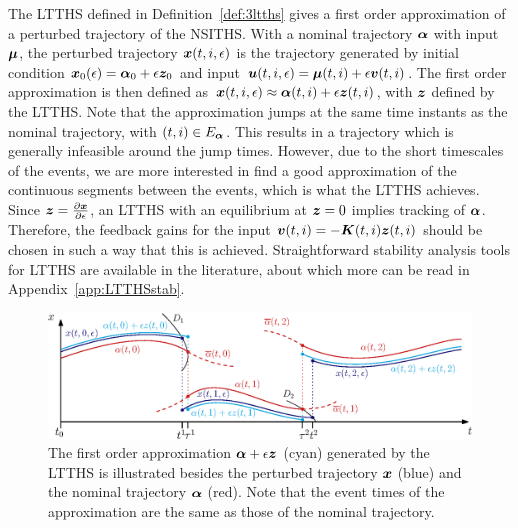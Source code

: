 \documentclass[../DC2017114Bouma.tex]{subfiles}
\begin{document}
The LTTHS defined in Definition~\ref{def:3ltths} gives a first order approximation of a perturbed trajectory of the NSITHS. With a nominal trajectory $\boldsymbol{\alpha}$ with input $\boldsymbol{\mu}$, the perturbed trajectory ${\boldsymbol{x}}(t,i,\epsilon)$ is the trajectory generated by initial condition ${\boldsymbol{x}}_0(\epsilon) = \boldsymbol{\alpha}_0 + \epsilon{\boldsymbol{z}}_0$ and input ${\boldsymbol{u}}(t,i,\epsilon) = \boldsymbol{\mu}(t,i) + \epsilon{\boldsymbol{v}}(t,i)$. The first order approximation is then defined as ${\boldsymbol{x}}(t,i,\epsilon) \approx \boldsymbol{\alpha}(t,i) + \epsilon{\boldsymbol{z}}(t,i)$, with ${\boldsymbol{z}}$ defined by the LTTHS. Note that the approximation jumps at the same time instants as the nominal trajectory, with $(t,i) \in E_{\boldsymbol{\alpha}}$. This results in a trajectory which is generally infeasible around the jump times. However, due to the short timescales of the events, we are more interested in find a good approximation of the continuous segments between the events, which is what the LTTHS achieves. Since ${\boldsymbol{z}} = \frac{\partial{\boldsymbol{x}}}{\partial\epsilon}$, an LTTHS with an equilibrium at ${\boldsymbol{z}} = 0$ implies tracking of $\boldsymbol{\alpha}$. Therefore, the feedback gains for the input ${\boldsymbol{v}}(t,i) = -{\boldsymbol{K}}(t,i){\boldsymbol{z}}(t,i)$ should be chosen in such a way that this is achieved. Straightforward stability analysis tools for LTTHS are available in the literature, about which more can be read in Appendix~\ref{app:LTTHSstab}.

\begin{figure}[h]
\centering
\includegraphics[width=.9\textwidth]{refspreadapprox.eps}\caption{The first order approximation $\boldsymbol{\alpha} + \epsilon{\boldsymbol{z}}$ (cyan) generated by the LTTHS is illustrated besides the perturbed trajectory ${\boldsymbol{x}}$ (blue) and the nominal trajectory $\boldsymbol{\alpha}$ (red). Note that the event times of the approximation are the same as those of the nominal trajectory.} \label{fig:3refspreadapprox}
\end{figure}
\end{document}

